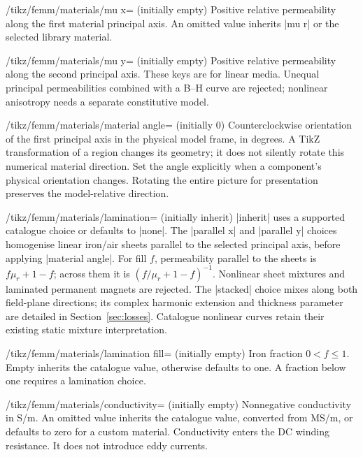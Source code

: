 \begin{key}{/tikz/femm/materials/mu x= (initially empty)}
Positive relative permeability along the first material principal axis.
An omitted value inherits |mu r| or the selected library material.
\end{key}
\begin{key}{/tikz/femm/materials/mu y= (initially empty)}
Positive relative permeability along the second principal axis. These keys are
for linear media. Unequal principal permeabilities combined with a B--H curve
are rejected; nonlinear anisotropy needs a separate constitutive model.
\end{key}
\begin{key}{/tikz/femm/materials/material angle= (initially 0)}
Counterclockwise orientation of the first principal axis in the physical model
frame, in degrees. A TikZ transformation of a region changes its geometry; it
does not silently rotate this numerical material direction. Set the angle
explicitly when a component's physical orientation changes. Rotating the entire
picture for presentation preserves the model-relative direction.
\end{key}
\begin{key}{/tikz/femm/materials/lamination= (initially inherit)}
|inherit| uses a supported catalogue choice or defaults to |none|. The
|parallel x| and |parallel y| choices homogenise linear iron/air
sheets parallel to the selected principal axis, before applying |material angle|.
For fill $f$, permeability parallel to the sheets is $f\mu_r+1-f$; across them
it is $(f/\mu_r+1-f)^{-1}$. Nonlinear sheet mixtures and laminated permanent
magnets are rejected. The |stacked| choice mixes along both field-plane directions; its complex
harmonic extension and thickness parameter are detailed in Section~\ref{sec:losses}.
Catalogue nonlinear curves retain their existing static mixture interpretation.
\end{key}
\begin{key}{/tikz/femm/materials/lamination fill= (initially empty)}
Iron fraction $0<f\leq1$. Empty inherits the catalogue value, otherwise defaults
to one. A fraction below one requires a lamination choice.
\end{key}
\begin{key}{/tikz/femm/materials/conductivity= (initially empty)}
Nonnegative conductivity in S/m. An omitted value inherits the catalogue value,
converted from MS/m, or defaults to zero for a custom material. Conductivity
enters the DC winding resistance. It does not introduce eddy currents.
\end{key}


